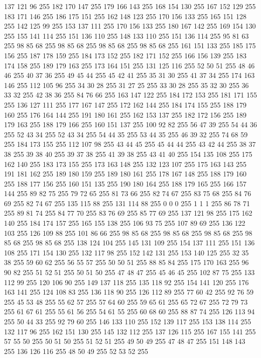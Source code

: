 137 121 96 255 182 170 147 255 179 166 143 255 168 154 130 255 167 152 129 255 183 171 146 255 186 175 151 255 162 148 123 255 170 156 133 255 165 151 128 255 142 125 99 255 153 137 111 255 170 156 133 255 180 167 142 255 169 154 130 255 155 141 114 255 151 136 110 255 148 133 110 255 151 136 114 255 95 81 63 255 98 85 68 255 98 85 68 255 98 85 68 255 98 85 68 255 161 151 133 255 185 175 156 255 187 178 159 255 184 173 152 255 182 171 152 255 166 156 139 255 183 174 158 255 189 179 163 255 173 164 151 255 131 125 116 255 52 50 51 255 48 46 46 255 40 37 36 255 49 45 44 255 45 42 41 255 35 31 30 255 41 37 34 255 174 163 146 255 112 105 96 255 34 30 28 255 31 27 25 255 33 30 28 255 35 32 30 255 36 33 32 255 42 38 36 255 84 76 66 255 163 147 122 255 184 172 153 255 181 171 155 255 136 127 111 255 177 167 147 255 172 162 144 255 184 174 155 255 188 179 160 255 176 164 144 255 191 180 161 255 162 153 137 255 182 172 156 255 189 179 163 255 188 179 166 255
160 151 137 255 100 92 82 255 56 47 39 255 54 44 36 255 52 43 34 255 52 43 34 255 54 44 35 255 53 44 35 255 46 39 32 255 74 68 59 255 184 173 155 255 112 107 98 255 43 44 45 255 45 44 44 255 43 42 44 255 38 37 38 255 39 38 40 255 39 37 38 255 41 39 38 255 43 41 40 255 154 135 108 255 175 162 140 255 183 173 155 255 173 163 148 255 132 123 107 255 175 163 143 255 191 181 162 255 189 180 159 255 189 180 161 255 178 167 148 255 188 179 160 255 188 177 156 255 160 151 135 255 190 180 164 255 188 179 165 255 166 157 144 255 89 82 75 255 79 72 65 255 81 73 66 255 82 74 67 255 83 75 68 255 84 76 69 255 82 74 67 255 135 115 88 255 131 114 88 255 0 0 0 255 1 1 1 255 86 78 71 255 89 81 74 255 84 77 70 255 83 76 69 255 85 77 69 255 137 121 98 255 175 162 140 255 184 174 157 255 165 155 138 255 106 93 75 255 107 89 69 255 136 122 103 255 126 109 88 255 101 86 66 255 98 85 68 255 98 85 68 255 98 85 68 255
98 85 68 255 98 85 68 255 138 124 104 255 145 131 109 255 154 137 111 255 151 136 108 255 171 154 130 255 132 117 98 255 152 142 131 255 153 140 125 255 32 35 38 255 59 60 62 255 56 55 57 255 50 50 51 255 88 85 84 255 175 170 163 255 96 90 82 255 51 52 51 255 50 51 50 255 47 48 47 255 45 46 45 255 102 87 75 255 133 112 99 255 120 106 90 255 149 137 118 255 135 118 92 255 154 141 120 255 176 163 141 255 124 108 83 255 136 118 90 255 126 112 89 255 77 60 42 255 92 76 59 255 45 53 48 255 55 62 57 255 57 64 60 255 59 65 61 255 65 72 67 255 72 79 73 255 61 67 61 255 55 61 56 255 54 61 55 255 60 68 60 255 88 87 74 255 126 113 94 255 50 44 33 255 92 79 60 255 146 133 110 255 152 139 117 255 153 138 114 255 132 117 96 255 162 151 130 255 145 132 112 255 137 126 115 255 167 155 141 255 57 55 50 255 50 51 50 255 51 52 51 255 49 50 49 255 47 48 47 255 151 148 143 255 136 126 116 255 48 50 49 255 52 53 52 255

